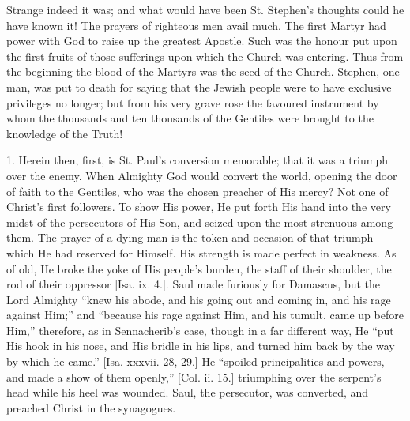 Strange indeed it was; and what would have been St. Stephen's
thoughts could he have known it! The prayers of righteous men avail
much. The first Martyr had power with God to raise up the greatest
Apostle. Such was the honour put upon the first-fruits of those
sufferings upon which the Church was entering. Thus from the beginning
the blood of the Martyrs was the seed of the Church. Stephen, one man,
was put to death for saying that the Jewish people were to have
exclusive privileges no longer; but from his very grave rose the
favoured instrument by whom the thousands and ten thousands of the
Gentiles were brought to the knowledge of the Truth!

1. Herein then, first, is St. Paul's conversion memorable; that it
was a triumph over the enemy. When Almighty God would convert the
world, opening the door of faith to the Gentiles, who was the chosen
preacher of His mercy? Not one of Christ's first followers. To show
His power, He put forth His hand into the very midst of the
persecutors of His Son, and seized upon the most strenuous among them.
The prayer of a dying man is the token and occasion of that triumph
which He had reserved for Himself. His strength is made perfect in
weakness. As of old, He broke the yoke of His people's burden, the
staff of their shoulder, the rod of their oppressor [Isa. ix. 4.].
Saul made furiously for Damascus, but the Lord Almighty ``knew his
abode, and his going out and coming in, and his rage against
Him;'' and ``because his rage against Him, and his tumult,
came up before Him,'' therefore, as in Sennacherib's case, though
in a far different way, He ``put His hook in his nose, and His
bridle in his lips, and turned him back by the way by which he
came.'' [Isa. xxxvii. 28, 29.] He ``spoiled principalities and
powers, and made a show of them openly,'' [Col. ii. 15.]
triumphing over the serpent's head while his heel was wounded. Saul,
the persecutor, was converted, and preached Christ in the synagogues.

